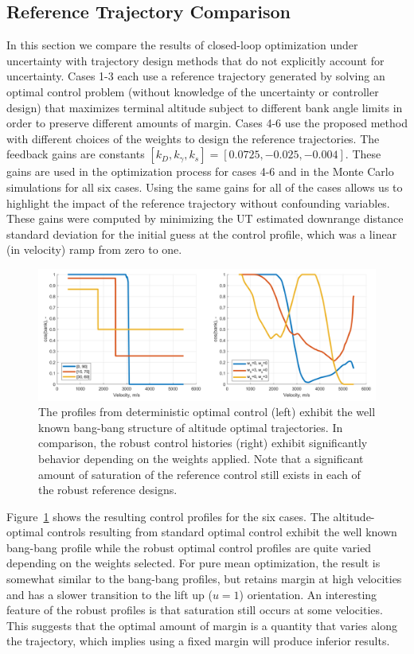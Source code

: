 \documentclass[journal ]{new-aiaa}
\begin{document}
\subsection*{Reference Trajectory Comparison}
In this section we compare the results of closed-loop optimization under uncertainty with trajectory design methods that do not explicitly account for uncertainty. Cases 1-3 each use a reference trajectory generated by solving an optimal control problem (without knowledge of the uncertainty or controller design) that maximizes terminal altitude subject to different bank angle limits in order to preserve different amounts of margin. Cases 4-6 use the proposed method with different choices of the weights to design the reference trajectories. The feedback gains are constants $[k_D, k_{\gamma}, k_s] = [0.0725, -0.025, -0.004]$. These gains are used in the optimization process for cases 4-6 and in the Monte Carlo simulations for all six cases. Using the same gains for all of the cases allows us to highlight the impact of the reference trajectory without confounding variables. These gains were computed by minimizing the UT estimated downrange distance standard deviation for the initial guess at the control profile, which was a linear (in velocity) ramp from zero to one. 
\begin{figure}[h!]
	\centering
	\includegraphics[width=1\textwidth]{ddp/comparison_controls}
	\caption{The profiles from deterministic optimal control (left) exhibit the well known bang-bang structure of altitude optimal trajectories. In comparison, the robust control histories (right) exhibit significantly behavior depending on the weights applied. Note that a significant amount of saturation of the reference control still exists in each of the robust reference designs.}
	\label{fig_control_comparison}
\end{figure}
Figure~\ref{fig_control_comparison} shows the resulting control profiles for the six cases. The altitude-optimal controls resulting from standard optimal control exhibit the well known bang-bang profile while the robust optimal control profiles are quite varied depending on the weights selected. For pure mean optimization, the result is somewhat similar to the bang-bang profiles, but retains margin at high velocities and has a slower transition to the lift up ($u=1$) orientation. An interesting feature of the robust profiles is that saturation still occurs at some velocities. This suggests that the optimal amount of margin is a quantity that varies along the trajectory, which implies using a fixed margin will produce inferior results.
\end{document}
